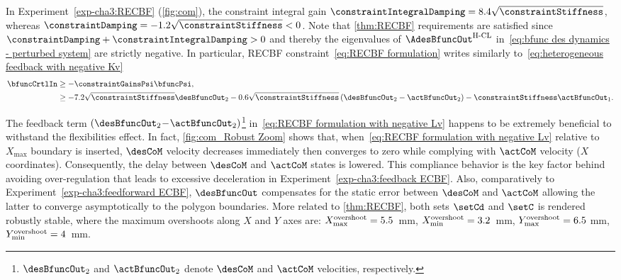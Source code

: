 In Experiment~\ref{exp-cha3:RECBF} (\cref{fig:com}), the constraint integral gain  $\constraintIntegralDamping = 8.4\sqrt{\constraintStiffness}$, whereas $\constraintDamping = -1.2\sqrt{\constraintStiffness}<0$. Note that \cref{thm:RECBF} requirements are satisfied since $\constraintDamping+\constraintIntegralDamping>0$  and thereby the eigenvalues of $\AdesBfuncOut^{\text{H-CL}}$ in~\cref{eq:bfunc des dynamics - perturbed system} are strictly negative. In particular, RECBF constraint~\eqref{eq:RECBF formulation} writes similarly to~\cref{eq:heterogeneous feedback with negative Kv}
\begin{align}\label{eq:RECBF formulation with negative Lv}
\begin{split}
	\bfuncCrtlIn &\geq -\constraintGainsPsi\bfuncPsi,\\
	&\geq - 7.2\sqrt{\constraintStiffness}\desBfuncOut_2 - 0.6\sqrt{\constraintStiffness}\left(\desBfuncOut_2-\actBfuncOut_2\right) - \constraintStiffness\actBfuncOut_1.
\end{split}	
\end{align}

The feedback term $\left(\desBfuncOut_2\!-\!\actBfuncOut_2\right)$\footnote{ $\desBfuncOut_2$  and $\actBfuncOut_2$ denote $\desCoM$ and $\actCoM$ velocities, respectively.} in~\cref{eq:RECBF formulation with negative Lv} happens to be extremely beneficial to withstand the flexibilities effect. In fact, \cref{fig:com_Robust Zoom} shows that, when~\cref{eq:RECBF formulation with negative Lv} relative to ${X}_{\max}$ boundary is inserted, $\desCoM$ velocity decreases immediately then converges to zero while complying with $\actCoM$ velocity (${X}$ coordinates). Consequently, the delay between $\desCoM$ and $\actCoM$ states is lowered. This compliance behavior is the key factor behind avoiding over-regulation that leads to excessive deceleration in Experiment~\eqref{exp-cha3:feedback ECBF}.
Also, comparatively to Experiment~\ref{exp-cha3:feedforward ECBF}, $\desBfuncOut$ compensates for the static error between  $\desCoM$ and $\actCoM$ allowing the latter to converge asymptotically to the polygon boundaries. %
More related to \cref{thm:RECBF}, both sets $\setCd$ and $\setC$ is rendered robustly stable, where the maximum overshoots along ${X}$ and ${Y}$ axes are:  ${X}_{\max}^{\rm{overshoot}} = 5.5$~mm, ${X}_{\min}^{\rm{overshoot}} = 3.2$~mm, ${Y}_{\max}^{\rm{overshoot}} = 6.5~$mm, ${Y}_{\min}^{\rm{overshoot}} = 4$~mm. 

